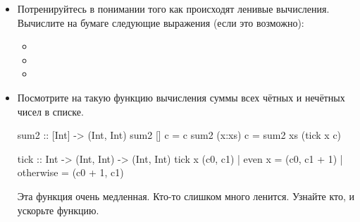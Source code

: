 \begin{itemize}

\item Потренируйтесь в понимании того как происходят
        ленивые вычисления. Вычислите на бумаге 
        следующие выражения (если это возможно):


\begin{itemize}
\item 
{}

\item {}
\item {}
\end{itemize}

\item Посмотрите на такую функцию вычисления суммы
        всех чётных и нечётных чисел в списке. 

\begin{code}
sum2 :: [Int] -> (Int, Int)
sum2 []     c = c
sum2 (x:xs) c = sum2 xs (tick x c)

tick :: Int -> (Int, Int) -> (Int, Int)
tick x (c0, c1) | even x    = (c0, c1 + 1)
                | otherwise = (c0 + 1, c1)
\end{code} 

    Эта функция очень медленная. Кто-то слишком много ленится.
    Узнайте кто, и ускорьте функцию.
    
\end{itemize}
